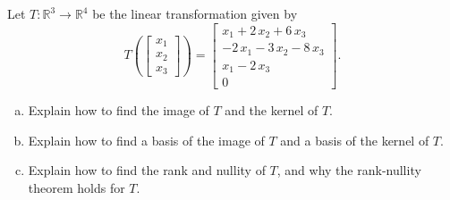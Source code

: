
\begin{exerciseStatement}
 Let \(T:\mathbb{R}^ 3  \to \mathbb{R}^ 4 \) be the linear transformation given by \[T\left(  \left[\begin{array}{c}
x_{1} \\
x_{2} \\
x_{3}
\end{array}\right]  \right) =  \left[\begin{array}{c}
x_{1} + 2 \, x_{2} + 6 \, x_{3} \\
-2 \, x_{1} - 3 \, x_{2} - 8 \, x_{3} \\
x_{1} - 2 \, x_{3} \\
0
\end{array}\right] .\]
\begin{enumerate}[(a)]
\item Explain how to find the image of \(T\) and the kernel of \(T\).
\item Explain how to find a basis of the image of \(T\) and a basis of the kernel of \(T\).
\item Explain how to find the rank and nullity of \(T\), and why the rank-nullity theorem holds for \(T\).
\end{enumerate}
    
\end{exerciseStatement}
    
